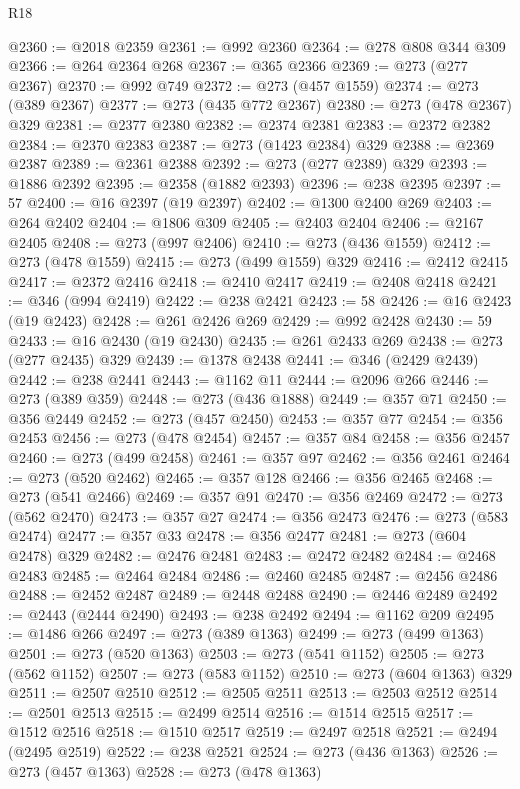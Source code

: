 \begin{lexlean}{R18}
\begin{coremodule}
{{{{{{{{{{{{{{{{{{{{{{{{{{{{{{{{{{{{{{{{{{{{{{{{{{{{{{{{{{{{{{{{{{{{{{{{{{{{{{{{{{{{{{{{{{{{{{{{{{{{{{{{{{{{{{{{{{{{{{{{{{{{{{{{{{{{{{{{{{{{{{{@2360 := @2018 @2359
@2361 := @992 @2360
@2364 := @278 @808 @344 @309
@2366 := @264 @2364 @268
@2367 := @365 @2366
@2369 := @273 (@277 @2367)
@2370 := @992 @749
@2372 := @273 (@457 @1559)
@2374 := @273 (@389 @2367)
@2377 := @273 (@435 @772 @2367)
@2380 := @273 (@478 @2367) @329
@2381 := @2377 @2380
@2382 := @2374 @2381
@2383 := @2372 @2382
@2384 := @2370 @2383
@2387 := @273 (@1423 @2384) @329
@2388 := @2369 @2387
@2389 := @2361 @2388
@2392 := @273 (@277 @2389) @329
@2393 := @1886 @2392
@2395 := @2358 (@1882 @2393)
@2396 := @238 @2395
@2397 := 57
@2400 := @16 @2397 (@19 @2397)
@2402 := @1300 @2400 @269
@2403 := @264 @2402
@2404 := @1806 @309
@2405 := @2403 @2404
@2406 := @2167 @2405
@2408 := @273 (@997 @2406)
@2410 := @273 (@436 @1559)
@2412 := @273 (@478 @1559)
@2415 := @273 (@499 @1559) @329
@2416 := @2412 @2415
@2417 := @2372 @2416
@2418 := @2410 @2417
@2419 := @2408 @2418
@2421 := @346 (@994 @2419)
@2422 := @238 @2421
@2423 := 58
@2426 := @16 @2423 (@19 @2423)
@2428 := @261 @2426 @269
@2429 := @992 @2428
@2430 := 59
@2433 := @16 @2430 (@19 @2430)
@2435 := @261 @2433 @269
@2438 := @273 (@277 @2435) @329
@2439 := @1378 @2438
@2441 := @346 (@2429 @2439)
@2442 := @238 @2441
@2443 := @1162 @11
@2444 := @2096 @266
@2446 := @273 (@389 @359)
@2448 := @273 (@436 @1888)
@2449 := @357 @71
@2450 := @356 @2449
@2452 := @273 (@457 @2450)
@2453 := @357 @77
@2454 := @356 @2453
@2456 := @273 (@478 @2454)
@2457 := @357 @84
@2458 := @356 @2457
@2460 := @273 (@499 @2458)
@2461 := @357 @97
@2462 := @356 @2461
@2464 := @273 (@520 @2462)
@2465 := @357 @128
@2466 := @356 @2465
@2468 := @273 (@541 @2466)
@2469 := @357 @91
@2470 := @356 @2469
@2472 := @273 (@562 @2470)
@2473 := @357 @27
@2474 := @356 @2473
@2476 := @273 (@583 @2474)
@2477 := @357 @33
@2478 := @356 @2477
@2481 := @273 (@604 @2478) @329
@2482 := @2476 @2481
@2483 := @2472 @2482
@2484 := @2468 @2483
@2485 := @2464 @2484
@2486 := @2460 @2485
@2487 := @2456 @2486
@2488 := @2452 @2487
@2489 := @2448 @2488
@2490 := @2446 @2489
@2492 := @2443 (@2444 @2490)
@2493 := @238 @2492
@2494 := @1162 @209
@2495 := @1486 @266
@2497 := @273 (@389 @1363)
@2499 := @273 (@499 @1363)
@2501 := @273 (@520 @1363)
@2503 := @273 (@541 @1152)
@2505 := @273 (@562 @1152)
@2507 := @273 (@583 @1152)
@2510 := @273 (@604 @1363) @329
@2511 := @2507 @2510
@2512 := @2505 @2511
@2513 := @2503 @2512
@2514 := @2501 @2513
@2515 := @2499 @2514
@2516 := @1514 @2515
@2517 := @1512 @2516
@2518 := @1510 @2517
@2519 := @2497 @2518
@2521 := @2494 (@2495 @2519)
@2522 := @238 @2521
@2524 := @273 (@436 @1363)
@2526 := @273 (@457 @1363)
@2528 := @273 (@478 @1363)
}}}}}}}}}}}}}}}}}}}}}}}}}}}}}}}}}}}}}}}}}}}}}}}}}}}}}}}}}}}}}}}}}}}}}}}}}}}}}}}}}}}}}}}}}}}}}}}}}}}}}}}}}}}}}}}}}}}}}}}}}}}}}}}}}}}}}}}}}}}}}}}
\end{coremodule}
\end{lexlean}
